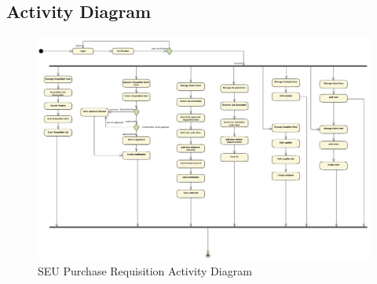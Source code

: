 \documentclass[12pt]{report} %
\begin{document}
\begin{landscape}
\subsection{Activity Diagram}
\begin{figure}[h]

	\begin{center}
	\includegraphics[width=1\textwidth]{pic/Activity/seupr_full_activity.png}
	\end{center}
	\caption{SEU Purchase Requisition Activity Diagram}
	\label{fig:activity}
\end{figure}
\thispagestyle{empty} 
\end{landscape}

\restoregeometry





\ifx
\end{document}
